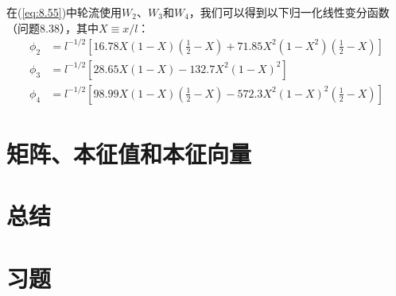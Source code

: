 \begin{examplebox}
        在(\ref{eq:8.55})中轮流使用$W_2$、$W_3$和$W_4$，我们可以得到以下归一化线性变分函数（问题8.38），其中$X \equiv x/l$：
        \begin{equation}
            \begin{aligned}
                \phi_2 &= l^{-1/2}\left[16.78X\left(1-X\right)\left(\frac{1}{2} - X\right) + 71.85X^2\left(1-X^2\right)\left(\frac{1}{2} - X\right)\right] \\
                \phi_3 &= l^{-1/2}\left[28.65X\left(1-X\right) - 132.7X^2\left(1-X\right)^2\right] \\
                \phi_4 &= l^{-1/2}\left[98.99X\left(1-X\right)\left(\frac{1}{2} - X\right) - 572.3X^2\left(1-X\right)^2\left(\frac{1}{2} - X\right)\right]
            \end{aligned}
            \label{eq:8.75}
        \end{equation}
    \end{examplebox}

\section{矩阵、本征值和本征向量}
\label{sec:8.6 Matrices, Eigenvalues, and Eigenvectors}















\section*{总结}

\section*{习题}